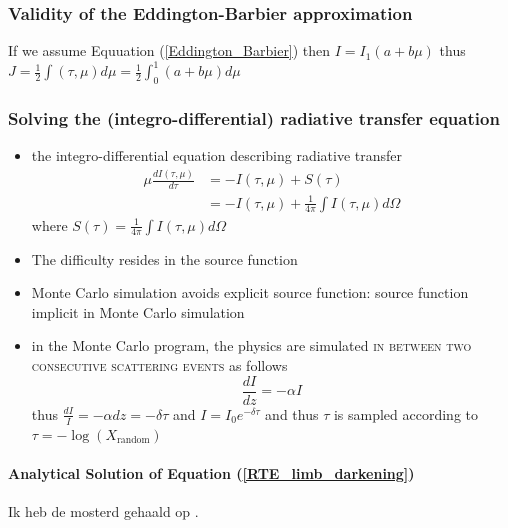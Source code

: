 \documentclass[../main/main.tex]{subfiles}
\begin{document}
\subsubsection{Validity of the Eddington-Barbier approximation}
If we assume Equuation (\ref{Eddington_Barbier}) then $I = I_1(a+b\mu)$ thus $J = \frac{1}{2} \int(\tau,\mu) d\mu = \frac{1}{2} \int_0^1 (a+b\mu)d\mu $

\noindent{}


\subsubsection{Solving the (integro-differential) radiative transfer equation}
\begin{itemize}
\item the integro-differential equation describing radiative transfer
\begin{equation}
\begin{aligned}
\mu \frac{dI(\tau,\mu)}{d\tau} &= -I(\tau,\mu) + S(\tau)  \\ 
&= -I(\tau,\mu)  + \frac{1}{4\pi} \int I(\tau,\mu) d\Omega
\end{aligned}
\label{RTE_limb_darkening}
\end{equation}
where $\boxed{S(\tau) = \frac{1}{4\pi} \int I(\tau,\mu) d\Omega}$

\item The difficulty resides in the source function

\item Monte Carlo simulation avoids explicit source function: source function implicit in Monte Carlo simulation

\item in the Monte Carlo program, the physics are simulated \textsc{in between two consecutive scattering events} as follows
\begin{equation}
\frac{dI}{dz} = -\alpha I 
\end{equation}
thus $\frac{dI}{I} = -\alpha dz = -\delta \tau$ and $I = I_0 e^{-\delta \tau}$ and thus $\tau$ is sampled according to $\tau = - \log(X_{\text{random}})$
\end{itemize}

\paragraph{Analytical Solution of Equation (\ref{RTE_limb_darkening})}
Ik heb de mosterd gehaald op \cite{Dublin_limb_darkening}.
\end{document}

